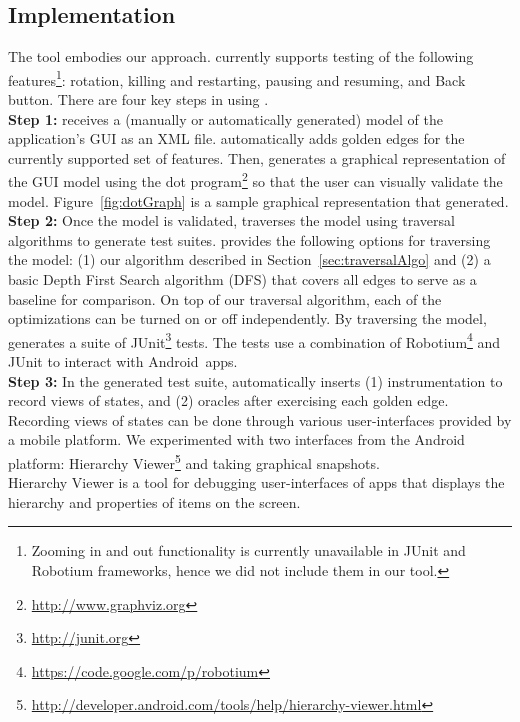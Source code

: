 \subsection{Implementation}

The \tool{} tool embodies our approach.  \tool{} currently supports
testing of the following features\footnote{Zooming in and out
  functionality is currently unavailable in JUnit and Robotium
  frameworks, hence we did not include them in our tool.}: rotation,
killing and restarting, pausing and resuming, and Back button.
{}
There are four key steps in using \tool.
\\
\indent
{\bf Step 1:} \tool{} receives a (manually or automatically generated)
model of the application's GUI as an XML file. \tool{} automatically
adds golden edges for the currently supported set of features.
Then, \tool{} generates a graphical representation of the GUI
model using the dot program\footnote{\url{http://www.graphviz.org}} so that
the user can visually validate the model. Figure~\ref{fig:dotGraph} is
a sample graphical representation that \tool{} generated.
\\
\indent
{\bf Step 2:}
Once the model is validated, \tool{} traverses the model using traversal algorithms to generate test suites. \tool{} provides the following options for traversing the model: (1) our algorithm described in Section~\ref{sec:traversalAlgo} and (2) a basic Depth First Search algorithm (DFS) that covers all edges to serve as a baseline for comparison. On top of our traversal algorithm, each of the optimizations can be turned on or off independently. By traversing the model, \tool{} generates a suite of JUnit\footnote{\url{http://junit.org}} tests. The tests use a combination of Robotium\footnote{\url{https://code.google.com/p/robotium}} and JUnit to interact with Android~apps.
\\
\indent
{\bf Step 3:}
In the generated test suite, \tool{} automatically inserts (1) instrumentation to record views of states, and (2) oracles after exercising each golden edge.
Recording views of states can be done through various user-interfaces provided by a mobile platform. We experimented with two interfaces from the Android platform: Hierarchy Viewer\footnote{\url{http://developer.android.com/tools/help/hierarchy-viewer.html}} and taking graphical snapshots.
\\
\indent
Hierarchy Viewer is a tool for debugging user-interfaces of apps that displays the hierarchy and properties of items on the screen.
